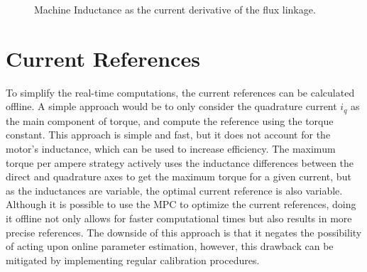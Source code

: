 \documentclass[9pt,conference]{IEEEtran}
\begin{document}
\begin{figure}[!htb]
	\begin{subfigmatrix}{2}
	\end{subfigmatrix}
	\caption{Machine Inductance as the current derivative of the flux linkage.}
	\label{fig:inductances}%
\end{figure}

\section{Current References}

To simplify the real-time computations, the current references can be calculated offline. A simple approach would be to only consider the quadrature current $i_q$ as the main component of torque, and compute the reference using the torque constant. This approach is simple and fast, but it does not account for the motor's inductance, which can be used to increase efficiency. The maximum torque per ampere strategy actively uses the inductance differences between the direct and quadrature axes to get the maximum torque for a given current, but as the inductances are variable, the optimal current reference is also variable. Although it is possible to use the MPC to optimize the current references, doing it offline not only allows for faster computational times but also results in more precise references. The downside of this approach is that it negates the possibility of acting upon online parameter estimation, however, this drawback can be mitigated by implementing regular calibration procedures.
\end{document}
